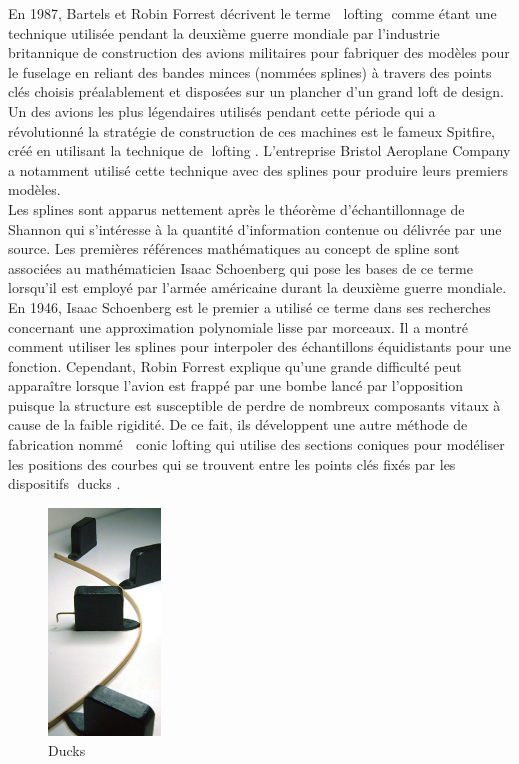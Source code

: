 \documentclass{article}
\begin{document}
	En 1987, Bartels et Robin Forrest d\'{e}crivent le terme \guillemotleft $\;$ lofting \guillemotright$\;$comme \'{e}tant une technique utilis\'{e}e pendant la deuxi\`{e}me guerre mondiale par l'industrie britannique de construction des avions militaires pour fabriquer des mod\`{e}les pour le fuselage en reliant des bandes minces (nomm\'{e}es splines) \`{a} travers des points cl\'{e}s choisis pr\'{e}alablement et dispos\'{e}es sur un plancher d'un grand loft de design. Un des avions les plus l\'{e}gendaires utilis\'{e}s pendant cette p\'{e}riode qui a r\'{e}volutionn\'{e} la strat\'{e}gie de construction de ces machines est le fameux Spitfire, cr\'{e}\'{e} en utilisant la technique de \guillemotleft $\;$lofting\guillemotleft $\;$. L'entreprise Bristol Aeroplane Company a notamment utilis\'{e} cette technique avec des splines pour produire leurs premiers mod\`{e}les. 
\\
\indent
	Les splines sont apparus nettement apr\`{e}s le th\'{e}or\`{e}me d'\'{e}chantillonnage de Shannon qui s'int\'{e}resse \`{a} la quantit\'{e} d'information contenue ou d\'{e}livr\'{e}e par une source.
	Les premi\`{e}res r\'{e}f\'{e}rences math\'{e}matiques au concept de spline sont associ\'{e}es au math\'{e}maticien Isaac Schoenberg qui pose les bases de ce terme lorsqu'il est employ\'{e} par l'arm\'{e}e am\'{e}ricaine durant la deuxi\`{e}me guerre mondiale.
\\
\indent
	En 1946, Isaac Schoenberg est le premier a utilis\'{e} ce terme dans ses recherches concernant une approximation polynomiale lisse par morceaux. Il a montr\'{e} comment utiliser les splines pour interpoler des \'{e}chantillons \'{e}quidistants pour une fonction. Cependant, Robin Forrest explique qu'une grande difficult\'{e} peut appara\^{i}tre lorsque l'avion est frapp\'{e} par une bombe lanc\'{e} par l'opposition puisque la structure est susceptible de perdre de nombreux composants vitaux \`{a} cause de la faible rigidit\'{e}. De ce fait, ils d\'{e}veloppent une autre m\'{e}thode de fabrication nomm\'{e} \guillemotleft $\;$ conic lofting \guillemotright qui utilise des sections coniques pour mod\'{e}liser les positions des courbes qui se trouvent entre les points cl\'{e}s fix\'{e}s par les dispositifs \guillemotleft $\;$ducks \guillemotright.

\begin{figure}[h]
	\centering
	\includegraphics[width=3cm]{ducks.jpg}
	\caption{Ducks}
\end{figure}
\end{document}
